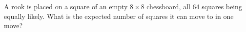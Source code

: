 A rook is placed on a square of an empty $8\times8$ chessboard, all $64$ squares being equally likely. What is the expected number of squares it can move to in one move?
